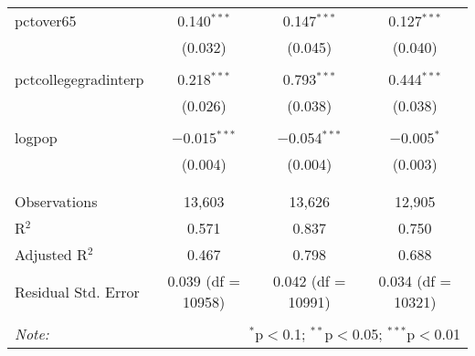 \documentclass[]{article}
\begin{document}
\begin{table}[!htbp]
\begin{tabular}{@{\extracolsep{5pt}}lccc}
 pctover65 & 0.140$^{***}$ & 0.147$^{***}$ & 0.127$^{***}$ \\ 
  & (0.032) & (0.045) & (0.040) \\ 
  & & & \\ 
 pctcollegegradinterp & 0.218$^{***}$ & 0.793$^{***}$ & 0.444$^{***}$ \\ 
  & (0.026) & (0.038) & (0.038) \\ 
  & & & \\ 
 logpop & $-$0.015$^{***}$ & $-$0.054$^{***}$ & $-$0.005$^{*}$ \\ 
  & (0.004) & (0.004) & (0.003) \\ 
  & & & \\ 
\hline \\[-1.8ex] 
Observations & 13,603 & 13,626 & 12,905 \\ 
R$^{2}$ & 0.571 & 0.837 & 0.750 \\ 
Adjusted R$^{2}$ & 0.467 & 0.798 & 0.688 \\ 
Residual Std. Error & 0.039 (df = 10958) & 0.042 (df = 10991) & 0.034 (df = 10321) \\ 
\hline 
\hline \\[-1.8ex] 
\textit{Note:}  & \multicolumn{3}{r}{$^{*}$p$<$0.1; $^{**}$p$<$0.05; $^{***}$p$<$0.01} \\ 
\end{tabular} 
\end{table}
\end{document}
